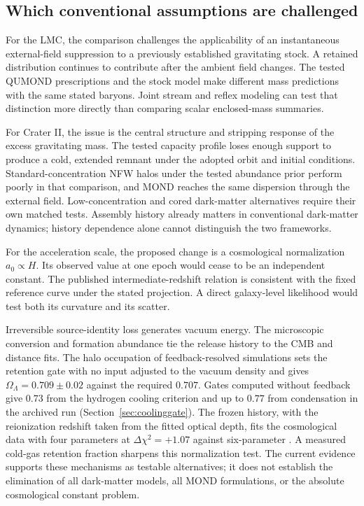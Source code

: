 \subsection{Which conventional assumptions are challenged}

For the LMC, the comparison challenges the applicability of an
instantaneous external-field suppression to a previously established
gravitating stock. A retained distribution continues to contribute after
the ambient field changes. The tested QUMOND prescriptions and the stock
model make different mass predictions with the same stated baryons.
Joint stream and reflex modeling can test that distinction more directly
than comparing scalar enclosed-mass summaries.

For Crater II, the issue is the central structure and stripping response
of the excess gravitating mass. The tested capacity profile loses enough
support to produce a cold, extended remnant under the adopted orbit and
initial conditions. Standard-concentration NFW halos under the tested
abundance prior perform poorly in that comparison, and MOND reaches the
same dispersion through the external field. Low-concentration
and cored dark-matter alternatives require their own matched tests.
Assembly history already matters in conventional dark-matter dynamics;
history dependence alone cannot distinguish the two frameworks.

For the acceleration scale, the proposed change is a cosmological
normalization $a_0\propto H$. Its observed value at one epoch would cease
to be an independent constant. The published intermediate-redshift
relation is consistent with the fixed reference curve under the stated
projection. A direct galaxy-level likelihood would test both its curvature
and its scatter.

Irreversible source-identity loss generates vacuum energy. The microscopic
conversion and formation abundance tie the release history to the CMB
and distance fits. The halo occupation of feedback-resolved simulations sets the retention
gate with no input adjusted to the vacuum density and gives
$\Omega_\Lambda=0.709\pm0.02$ against the required $0.707$. Gates computed
without feedback give $0.73$ from the hydrogen cooling criterion and up to
$0.77$ from condensation in the archived run
(Section~\ref{sec:coolinggate}). The frozen history, with the reionization redshift taken from the fitted optical depth, fits the cosmological data with four parameters at $\Delta\chi^2=+1.07$ against six-parameter \LCDM. A measured cold-gas retention fraction sharpens this normalization test. The current evidence supports these mechanisms as
testable alternatives; it does not establish the elimination of all
dark-matter models, all MOND formulations, or the absolute cosmological
constant problem.

